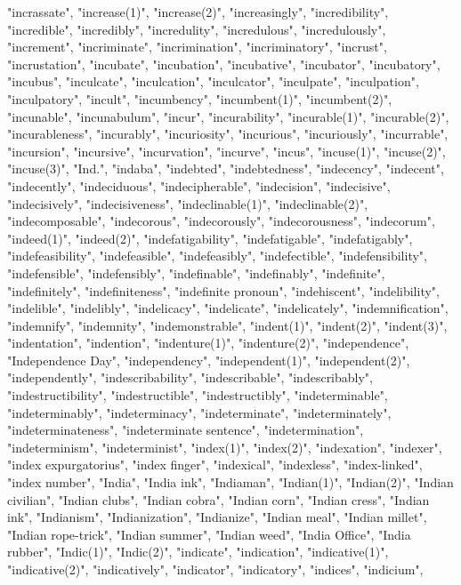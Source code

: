 "incrassate",
"increase(1)",
"increase(2)",
"increasingly",
"incredibility",
"incredible",
"incredibly",
"incredulity",
"incredulous",
"incredulously",
"increment",
"incriminate",
"incrimination",
"incriminatory",
"incrust",
"incrustation",
"incubate",
"incubation",
"incubative",
"incubator",
"incubatory",
"incubus",
"inculcate",
"inculcation",
"inculcator",
"inculpate",
"inculpation",
"inculpatory",
"incult",
"incumbency",
"incumbent(1)",
"incumbent(2)",
"incunable",
"incunabulum",
"incur",
"incurability",
"incurable(1)",
"incurable(2)",
"incurableness",
"incurably",
"incuriosity",
"incurious",
"incuriously",
"incurrable",
"incursion",
"incursive",
"incurvation",
"incurve",
"incus",
"incuse(1)",
"incuse(2)",
"incuse(3)",
"Ind.",
"indaba",
"indebted",
"indebtedness",
"indecency",
"indecent",
"indecently",
"indeciduous",
"indecipherable",
"indecision",
"indecisive",
"indecisively",
"indecisiveness",
"indeclinable(1)",
"indeclinable(2)",
"indecomposable",
"indecorous",
"indecorously",
"indecorousness",
"indecorum",
"indeed(1)",
"indeed(2)",
"indefatigability",
"indefatigable",
"indefatigably",
"indefeasibility",
"indefeasible",
"indefeasibly",
"indefectible",
"indefensibility",
"indefensible",
"indefensibly",
"indefinable",
"indefinably",
"indefinite",
"indefinitely",
"indefiniteness",
"indefinite pronoun",
"indehiscent",
"indelibility",
"indelible",
"indelibly",
"indelicacy",
"indelicate",
"indelicately",
"indemnification",
"indemnify",
"indemnity",
"indemonstrable",
"indent(1)",
"indent(2)",
"indent(3)",
"indentation",
"indention",
"indenture(1)",
"indenture(2)",
"independence",
"Independence Day",
"independency",
"independent(1)",
"independent(2)",
"independently",
"indescribability",
"indescribable",
"indescribably",
"indestructibility",
"indestructible",
"indestructibly",
"indeterminable",
"indeterminably",
"indeterminacy",
"indeterminate",
"indeterminately",
"indeterminateness",
"indeterminate sentence",
"indetermination",
"indeterminism",
"indeterminist",
"index(1)",
"index(2)",
"indexation",
"indexer",
"index expurgatorius",
"index finger",
"indexical",
"indexless",
"index-linked",
"index number",
"India",
"India ink",
"Indiaman",
"Indian(1)",
"Indian(2)",
"Indian civilian",
"Indian clubs",
"Indian cobra",
"Indian corn",
"Indian cress",
"Indian ink",
"Indianism",
"Indianization",
"Indianize",
"Indian meal",
"Indian millet",
"Indian rope-trick",
"Indian summer",
"Indian weed",
"India Office",
"India rubber",
"Indic(1)",
"Indic(2)",
"indicate",
"indication",
"indicative(1)",
"indicative(2)",
"indicatively",
"indicator",
"indicatory",
"indices",
"indicium",
